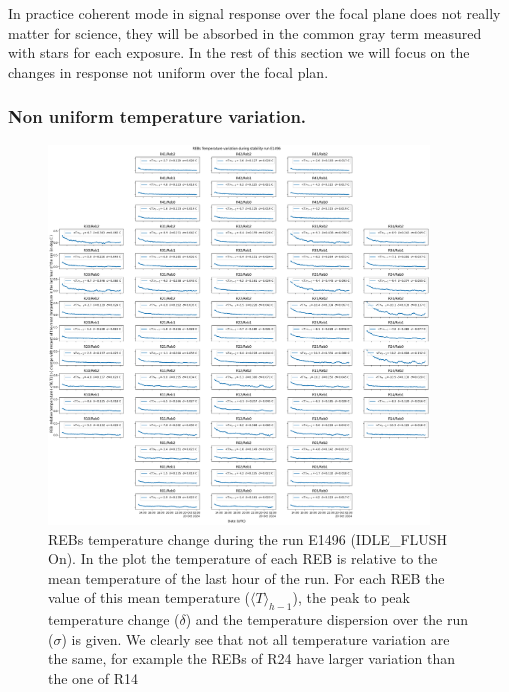In practice coherent mode in signal response over the focal plane does not really matter for science, they will be absorbed in the common gray term measured with stars for each exposure. In the rest of this section we will focus on the changes in response not uniform over the focal plan. 

\subsubsection{Non uniform temperature variation.} 

\begin{figure}[ht]
\begin{centering}
\includegraphics[width=0.9\textwidth]{figures/FocalPlanTempRun_E1496.png}
\end{centering}
\caption{REBs temperature change during the run E1496 (IDLE\_FLUSH On). In the plot the temperature of each REB is relative to the mean temperature of the last hour of the run. For each REB the value of this mean temperature ($\langle T \rangle_{h-1}$), the peak to peak temperature change ($\delta$) and the temperature dispersion over the run ($\sigma$) is given. We clearly see that not all temperature variation are the same, for example the REBs of R24 have larger variation than the one of R14}   
\label{fig:tempE1496}
\end{figure}

